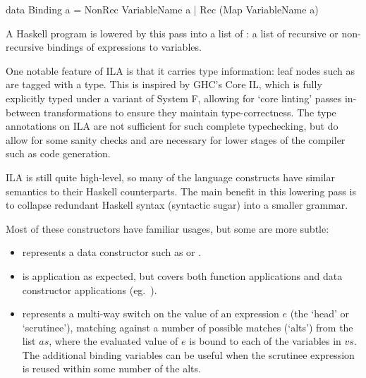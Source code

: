 \documentclass[dissertation.tex]{subfiles}
\begin{document}
{{{\begin{haskellfigure}
            data Binding a = NonRec VariableName a
                           | Rec (Map VariableName a)
            \end{haskellfigure}

            A Haskell program is lowered by this pass into a list of : a list of recursive or
            non-recursive bindings of expressions to variables.

            One notable feature of ILA is that it carries type information: leaf nodes such as  are
            tagged with a type. This is inspired by GHC's Core IL, which is fully explicitly typed under a variant
            of System F, allowing for `core linting' passes in-between transformations to ensure they maintain
            type-correctness. The type annotations on ILA are not sufficient for such complete typechecking, but do
            allow for some sanity checks and are necessary for lower stages of the compiler such as code generation.

            ILA is still quite high-level, so many of the language constructs have similar semantics to their
            Haskell counterparts. The main benefit in this lowering pass is to collapse redundant Haskell syntax
            (syntactic sugar) into a smaller grammar.

            Most of these constructors have familiar usages, but some are more subtle:

            \begin{itemize}
            \item {} represents a data constructor such as  or .
            \item
            {

                 is application as expected, but covers both function applications and data
                constructor applications (eg.\ ).


            }
            \item
            {

                 represents a multi-way switch on the value of an expression \(e\)
                (the `head' or `scrutinee'), matching against a number of possible matches (`alts') from the list
                \(as\), where the evaluated value of \(e\) is bound to each of the variables in \(vs\). The
                additional binding variables can be useful when the scrutinee expression is reused within some
                number of the alts.

}
\end{itemize}}}}
\end{document}
